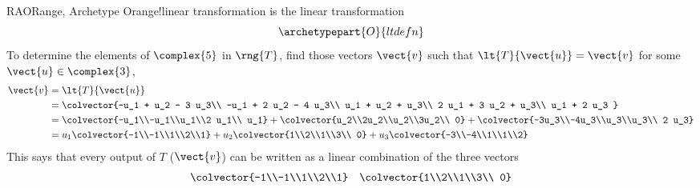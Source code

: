 \begin{example}{RAO}{Range, Archetype O}{range!linear transformation}
 is the linear transformation
%
\begin{equation*}
\archetypepart{O}{ltdefn}
\end{equation*}
%
To determine the elements of $\complex{5}$ in $\rng{T}$, find those vectors $\vect{v}$ such that $\lt{T}{\vect{u}}=\vect{v}$ for some $\vect{u}\in\complex{3}$,
%
\begin{align*}
\vect{v}&=\lt{T}{\vect{u}}\\
&=\colvector{-u_1 + u_2 - 3 u_3\\
-u_1 + 2 u_2 - 4 u_3\\
u_1 + u_2 + u_3\\
2 u_1 + 3 u_2 + u_3\\
u_1 + 2 u_3
}\\
&=
\colvector{-u_1\\-u_1\\u_1\\2 u_1\\ u_1}
+
\colvector{u_2\\2u_2\\u_2\\3u_2\\ 0}
+
\colvector{-3u_3\\-4u_3\\u_3\\u_3\\ 2 u_3}\\
&=
u_1\colvector{-1\\-1\\1\\2\\1}
+
u_2\colvector{1\\2\\1\\3\\ 0}
+
u_3\colvector{-3\\-4\\1\\1\\2}
%
\end{align*}
%
This says that every output of $T$ ($\vect{v}$) can be written as a linear combination of the three vectors
%
\begin{align*}
\colvector{-1\\-1\\1\\2\\1}
&&
\colvector{1\\2\\1\\3\\ 0}

\end{align*}
\end{example}
